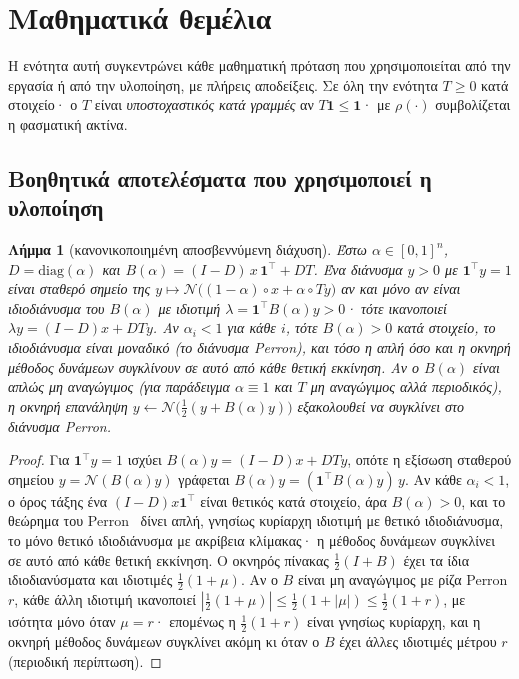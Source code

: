 \documentclass[11pt,a4paper]{article}
\newtheorem{lemma}{Λήμμα}
\theoremstyle{definition}
\theoremstyle{plain}
\newcommand{\diag}{\mathrm{diag}}
\newcommand{\N}{\mathcal{N}}
\newcommand{\one}{\mathbf{1}}
\begin{document}
\section{Μαθηματικά θεμέλια}\label{sec:math}

Η ενότητα αυτή συγκεντρώνει κάθε μαθηματική πρόταση που χρησιμοποιείται από την εργασία ή από την υλοποίηση, με πλήρεις αποδείξεις. Σε όλη την ενότητα $T\ge0$ κατά στοιχείο· ο $T$ είναι \emph{υποστοχαστικός κατά γραμμές} αν $T\one\le\one$· με $\rho(\cdot)$ συμβολίζεται η φασματική ακτίνα.

\subsection{Βοηθητικά αποτελέσματα που χρησιμοποιεί η υλοποίηση}

\begin{lemma}[κανονικοποιημένη αποσβεννύμενη διάχυση]\label{lem:diffusion}
Έστω $\alpha\in[0,1]^n$, $D=\diag(\alpha)$ και $B(\alpha)=(I-D)\,x\,\one^{\top}+DT$. Ένα διάνυσμα $y>0$ με $\one^{\top}y=1$ είναι σταθερό σημείο της $y\mapsto\N\big((1-\alpha)\circ x+\alpha\circ Ty\big)$ αν και μόνο αν είναι ιδιοδιάνυσμα του $B(\alpha)$ με ιδιοτιμή $\lambda=\one^{\top}B(\alpha)y>0$· τότε ικανοποιεί $\lambda y=(I-D)x+DTy$. Αν $\alpha_i<1$ για κάθε $i$, τότε $B(\alpha)>0$ κατά στοιχείο, το ιδιοδιάνυσμα είναι μοναδικό (το διάνυσμα Perron), και τόσο η απλή όσο και η οκνηρή μέθοδος δυνάμεων συγκλίνουν σε αυτό από κάθε θετική εκκίνηση. Αν ο $B(\alpha)$ είναι απλώς μη αναγώγιμος (για παράδειγμα $\alpha\equiv1$ και $T$ μη αναγώγιμος αλλά περιοδικός), η οκνηρή επανάληψη $y\leftarrow\N\big(\tfrac12(y+B(\alpha)y)\big)$ εξακολουθεί να συγκλίνει στο διάνυσμα Perron.
\end{lemma}

\begin{proof}
Για $\one^{\top}y=1$ ισχύει $B(\alpha)y=(I-D)x+DTy$, οπότε η εξίσωση σταθερού σημείου $y=\N(B(\alpha)y)$ γράφεται $B(\alpha)y=(\one^{\top}B(\alpha)y)\,y$. Αν κάθε $\alpha_i<1$, ο όρος τάξης ένα $(I-D)x\one^{\top}$ είναι θετικός κατά στοιχείο, άρα $B(\alpha)>0$, και το θεώρημα του Perron~\cite{hornjohnson13} δίνει απλή, γνησίως κυρίαρχη ιδιοτιμή με θετικό ιδιοδιάνυσμα, το μόνο θετικό ιδιοδιάνυσμα με ακρίβεια κλίμακας· η μέθοδος δυνάμεων συγκλίνει σε αυτό από κάθε θετική εκκίνηση. Ο οκνηρός πίνακας $\tfrac12(I+B)$ έχει τα ίδια ιδιοδιανύσματα και ιδιοτιμές $\tfrac12(1+\mu)$. Αν ο $B$ είναι μη αναγώγιμος με ρίζα Perron $r$, κάθε άλλη ιδιοτιμή ικανοποιεί $|\tfrac12(1+\mu)|\le\tfrac12(1+|\mu|)\le\tfrac12(1+r)$, με ισότητα μόνο όταν $\mu=r$· επομένως η $\tfrac12(1+r)$ είναι γνησίως κυρίαρχη, και η οκνηρή μέθοδος δυνάμεων συγκλίνει ακόμη κι όταν ο $B$ έχει άλλες ιδιοτιμές μέτρου $r$ (περιοδική περίπτωση).
\end{proof}
\end{document}
